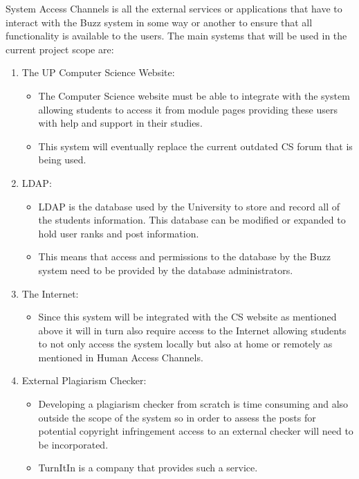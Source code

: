 System Access Channels is all the external services or applications that have to interact with the Buzz system in some way or another to ensure that all functionality is available to the users. The main systems that will be used in the current project scope are:

\begin{enumerate}
	\item The UP Computer Science Website:
	\begin{itemize}
		\item The Computer Science website must be able to integrate with the system allowing students to access it from module pages providing these users with help and support in their studies.
		\item This system will eventually replace the current outdated CS forum that is being used.
	\end{itemize}
	\item LDAP:
	\begin{itemize}
		\item LDAP is the database used by the University to store and record all of the students information. This database can be modified or expanded to hold user ranks and post information.
		\item This means that access and permissions to the database by the Buzz system need to be provided by the database administrators. 
	\end{itemize}
	\item The Internet:
	\begin{itemize}
		\item Since this system will be integrated with the CS website as mentioned above it will in turn also require access to the Internet allowing students to not only access the system locally but also at home or remotely as mentioned in Human Access Channels.
	\end{itemize}
	\item External Plagiarism Checker:
	\begin{itemize}
		\item Developing a plagiarism checker from scratch is time consuming and also outside the scope of the system so in order to assess the posts for potential copyright infringement access to an external checker will need to be incorporated.
		\item TurnItIn is a company that provides such a service.
	\end{itemize}
\end{enumerate} 